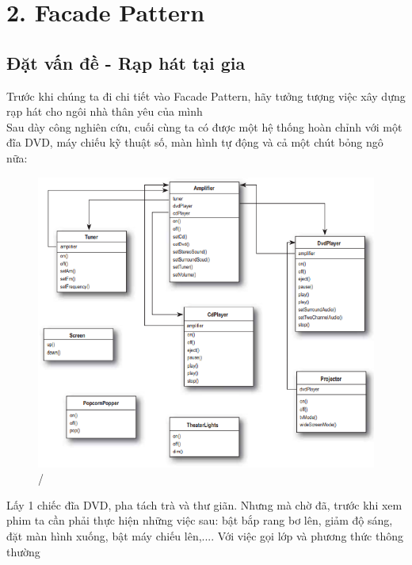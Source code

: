 \chapter{2. Facade Pattern}
\section{Đặt vấn đề - Rạp hát tại gia}
 Trước khi chúng ta đi chi tiết vào Facade Pattern, hãy tưởng tượng việc xây dựng rạp hát cho ngôi nhà thân yêu của mình\\[0.15in]
 Sau dày công nghiên cứu, cuối cùng ta có được một hệ thống hoàn chỉnh với một đĩa DVD, máy chiếu kỹ thuật số, màn hình tự động và cả một chút bỏng ngô nữa:

\begin{figure}[!htb]
    \centering
    \includegraphics[width=\textwidth]{fig/Facade/TheaterSystem.png}/
\end{figure}
\newpage
Lấy 1 chiếc đĩa DVD, pha tách trà và thư giãn. Nhưng mà chờ đã, trước khi xem phim ta cần phải thực hiện những việc sau: bật bắp rang bơ lên, giảm độ sáng, đặt màn hình xuống, bật máy chiếu lên,....  Với việc gọi lớp và phương thức thông thường

